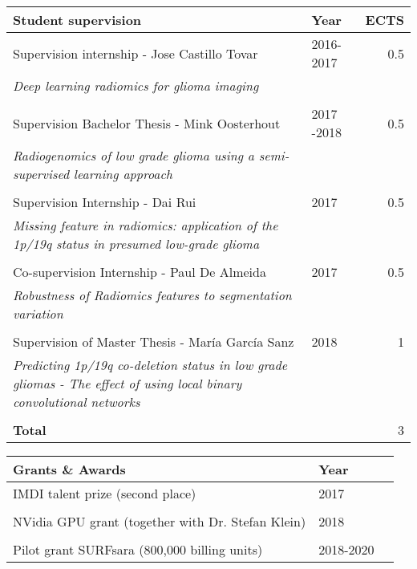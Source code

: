 \vspace*{0.5cm}
\begin{tabular}{L{8cm}lr}
    \textbf{Student supervision}&\textbf{Year}&\textbf{ECTS}\\
    \toprule
    Supervision internship - Jose Castillo Tovar & 2016-2017 & 0.5 \\
    \textit{Deep learning radiomics for glioma imaging}\\
    \\
    Supervision Bachelor Thesis - Mink Oosterhout & 2017 -2018 & 0.5 \\
    \textit{Radiogenomics of low grade glioma using a semi-supervised learning approach}\\
    \\
    Supervision Internship - Dai Rui & 2017 & 0.5 \\
    \textit{Missing feature in radiomics: application of the 1p/19q status in presumed low-grade glioma}\\
    \\
    Co-supervision Internship - Paul De Almeida & 2017 & 0.5\\
    \textit{Robustness of Radiomics features to segmentation variation}\\
    \\
    Supervision of Master Thesis - Mar{\'i}a Garc{\'i}a Sanz & 2018 & 1\\
    \textit{Predicting 1p/19q co-deletion status in low grade gliomas - The effect of using local binary convolutional networks}\\
    \\
    \textbf{Total} & & 3\\
\end{tabular}


\newpage
\begin{tabular}{L{8cm}lr}
    \textbf{Grants \& Awards}&\textbf{Year}\\
    \toprule
    IMDI talent prize (second place) & 2017\\
    \\
    NVidia GPU grant (together with Dr. Stefan Klein) & 2018\\
    \\
    Pilot grant SURFsara (800,000 billing units) & 2018-2020\\
\end{tabular}

